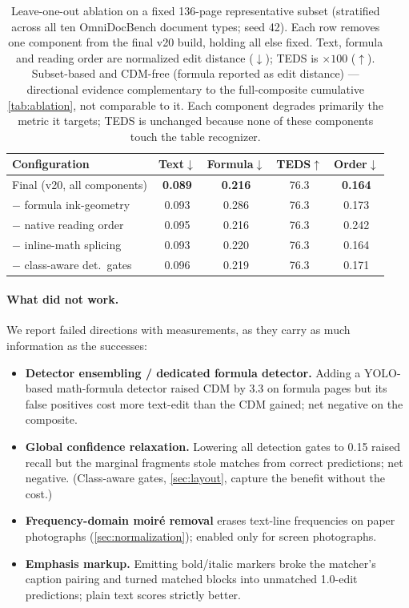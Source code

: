 \begin{table}[t]
\centering
\caption{Leave-one-out ablation on a fixed 136-page representative subset (stratified across all ten OmniDocBench document types; seed 42). Each row removes one component from the final v20 build, holding all else fixed. Text, formula and reading order are normalized edit distance ($\downarrow$); TEDS is $\times100$ ($\uparrow$). Subset-based and CDM-free (formula reported as edit distance) --- directional evidence complementary to the full-composite cumulative \cref{tab:ablation}, not comparable to it. Each component degrades primarily the metric it targets; TEDS is unchanged because none of these components touch the table recognizer.}
\label{tab:loo}
\small
\setlength{\tabcolsep}{4pt}
\begin{tabular}{lcccc}
\toprule
Configuration & Text$\downarrow$ & Formula$\downarrow$ & TEDS$\uparrow$ & Order$\downarrow$ \\
\midrule
Final (v20, all components) & \textbf{0.089} & \textbf{0.216} & 76.3 & \textbf{0.164} \\
\quad $-$ formula ink-geometry & 0.093 & 0.286 & 76.3 & 0.173 \\
\quad $-$ native reading order & 0.095 & 0.216 & 76.3 & 0.242 \\
\quad $-$ inline-math splicing & 0.093 & 0.220 & 76.3 & 0.164 \\
\quad $-$ class-aware det.\ gates & 0.096 & 0.219 & 76.3 & 0.171 \\
\bottomrule
\end{tabular}
\end{table}

\paragraph{What did not work.} We report failed directions with measurements, as they carry as much information as the successes:
\begin{itemize}
\item \textbf{Detector ensembling / dedicated formula detector.} Adding a YOLO-based math-formula detector raised CDM by 3.3 on formula pages but its false positives cost more text-edit than the CDM gained; net negative on the composite.
\item \textbf{Global confidence relaxation.} Lowering all detection gates to 0.15 raised recall but the marginal fragments stole matches from correct predictions; net negative. (Class-aware gates, \cref{sec:layout}, capture the benefit without the cost.)
\item \textbf{Frequency-domain moir\'e removal} erases text-line frequencies on paper photographs (\cref{sec:normalization}); enabled only for screen photographs.
\item \textbf{Emphasis markup.} Emitting bold/italic markers broke the matcher's caption pairing and turned matched blocks into unmatched 1.0-edit predictions; plain text scores strictly better.
\end{itemize}

